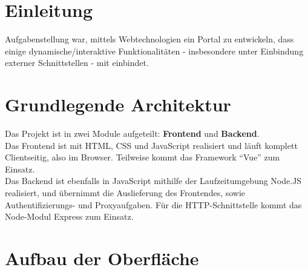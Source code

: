 \documentclass[fleqn,10pt]{SelfArx} %
\affiliation{\textsuperscript{1}\textit{Studiengang Informationstechnik, Fakultät Technik, Duale Schule Baden-Württemberg, Stuttgart}} %
\begin{document}
\flushbottom %

\maketitle %

\tableofcontents %

\thispagestyle{empty} %


\section*{Einleitung} %

Aufgabenstellung war, mittels Webtechnologien ein Portal zu entwickeln, dass einige dynamische/interaktive Funktionalitäten - insbesondere unter Einbindung externer Schnittstellen - mit einbindet. 

\section{Grundlegende Architektur}
Das Projekt ist in zwei Module aufgeteilt: \textbf{Frontend} und \textbf{Backend}. \\ Das Frontend ist mit HTML, CSS und JavaScript realisiert und läuft komplett Clientseitig, also im Browser. Teilweise kommt das Framework \enquote{Vue} zum Einsatz. \\ Das Backend ist ebenfalls in JavaScript mithilfe der Laufzeitumgebung Node.JS realisiert, und übernimmt die Auslieferung des Frontendes, sowie Authentifizierungs- und Proxyaufgaben. Für die HTTP-Schnittstelle kommt das Node-Modul Express zum Einsatz.
\section{Aufbau der Oberfläche}
\end{document}
